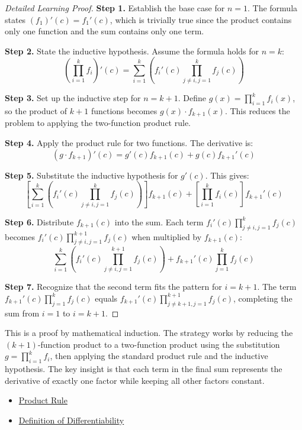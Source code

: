 \begin{proof}[Detailed Learning Proof]
\LRAProofBodyStart

\textbf{Step 1.} Establish the base case for $n=1$. The formula states $(f_1)'(c) = f_1'(c)$, which is trivially true since the product contains only one function and the sum contains only one term.

\textbf{Step 2.} State the inductive hypothesis. Assume the formula holds for $n=k$:
\[ \left( \prod_{i=1}^{k} f_i \right)'(c) = \sum_{i=1}^{k} \left( f_i'(c) \prod_{j \neq i, j=1}^{k} f_j(c) \right) \]

\textbf{Step 3.} Set up the inductive step for $n=k+1$. Define $g(x) = \prod_{i=1}^{k} f_i(x)$, so the product of $k+1$ functions becomes $g(x) \cdot f_{k+1}(x)$. This reduces the problem to applying the two-function product rule.

\textbf{Step 4.} Apply the product rule for two functions. The derivative is:
\[ (g \cdot f_{k+1})'(c) = g'(c)f_{k+1}(c) + g(c)f_{k+1}'(c) \]

\textbf{Step 5.} Substitute the inductive hypothesis for $g'(c)$. This gives:
\[ \left[ \sum_{i=1}^{k} \left( f_i'(c) \prod_{j \neq i, j=1}^{k} f_j(c) \right) \right] f_{k+1}(c) + \left[ \prod_{i=1}^{k} f_i(c) \right] f_{k+1}'(c) \]

\textbf{Step 6.} Distribute $f_{k+1}(c)$ into the sum. Each term $f_i'(c) \prod_{j \neq i, j=1}^{k} f_j(c)$ becomes $f_i'(c) \prod_{j \neq i, j=1}^{k+1} f_j(c)$ when multiplied by $f_{k+1}(c)$:
\[ \sum_{i=1}^{k} \left( f_i'(c) \prod_{j \neq i, j=1}^{k+1} f_j(c) \right) + f_{k+1}'(c) \prod_{j=1}^{k} f_j(c) \]

\textbf{Step 7.} Recognize that the second term fits the pattern for $i=k+1$. The term $f_{k+1}'(c) \prod_{j=1}^{k} f_j(c)$ equals $f_{k+1}'(c) \prod_{j \neq k+1, j=1}^{k+1} f_j(c)$, completing the sum from $i=1$ to $i=k+1$.
\end{proof}

\begin{remark*}
This is a proof by mathematical induction. The strategy works by reducing the $(k+1)$-function product to a two-function product using the substitution $g = \prod_{i=1}^{k} f_i$, then applying the standard product rule and the inductive hypothesis. The key insight is that each term in the final sum represents the derivative of exactly one factor while keeping all other factors constant.
\end{remark*}

\begin{dependencies}
\begin{itemize}
  \item \hyperref[thm:product-rule]{Product Rule}
  \item \hyperref[def:derivative-at-a-point]{Definition of Differentiability}
\end{itemize}
\end{dependencies}

\clearpage
